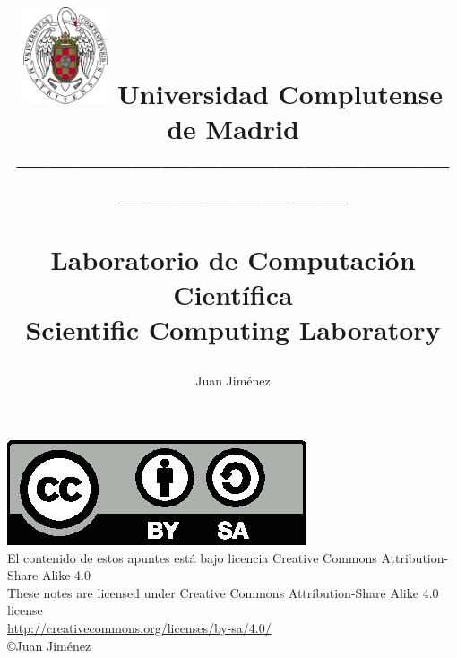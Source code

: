 \documentclass[a4paper,10pt]{book}
\begin{document}
\title{
\begin{flushleft}
\includegraphics[width=2.5cm]{ucm2.pdf} 
Universidad Complutense de Madrid\\
---------------------------------------------------------------------
\end{flushleft}
Laboratorio de Computación Científica\\ Scientific Computing Laboratory}
\author{ Juan Jim\'enez\\}
\maketitle

\vspace*{\fill}
\includegraphics[scale=1]{by-sa.eps}\\
El contenido de estos apuntes está bajo licencia Creative Commons Attribution-Share Alike 4.0\\
These notes are licensed under Creative Commons Attribution-Share Alike 4.0 license\\  
\href{http://creativecommons.org/licenses/by-sa/4.0/}{http://creativecommons.org/licenses/by-sa/4.0/}\\
\copyright Juan Jiménez

\bigskip
\tableofcontents
\listoffigures
\listoftables


%
%
%
%
%
%
%
%
%
\printindex
\end{document}

